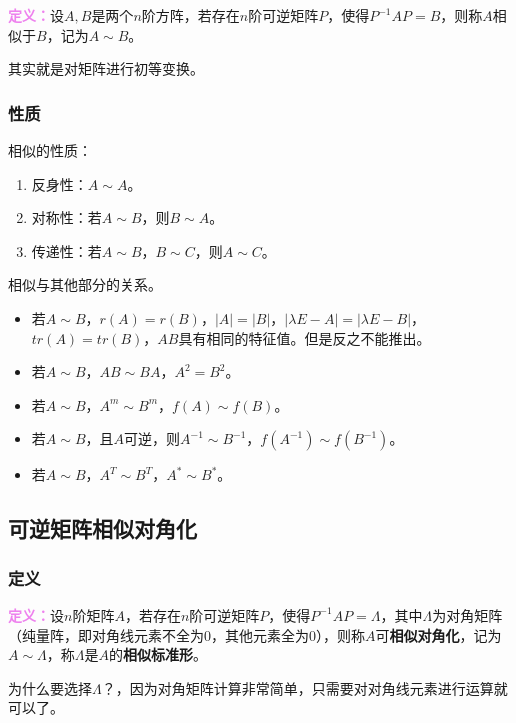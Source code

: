 \documentclass[UTF8, 12pt]{ctexart}
\begin{document}
\textcolor{violet}{\textbf{定义：}}设$A,B$是两个$n$阶方阵，若存在$n$阶可逆矩阵$P$，使得$P^{-1}AP=B$，则称$A$相似于$B$，记为$A\sim B$。

其实就是对矩阵进行初等变换。

\subsubsection{性质}

相似的性质：

\begin{enumerate}
    \item 反身性：$A\sim A$。
    \item 对称性：若$A\sim B$，则$B\sim A$。
    \item 传递性：若$A\sim B$，$B\sim C$，则$A\sim C$。
\end{enumerate}

相似与其他部分的关系。

\begin{itemize}
    \item 若$A\sim B$，$r(A)=r(B)$，$\vert A\vert=\vert B\vert$，$\vert\lambda E-A\vert=\vert\lambda E-B\vert$，$tr(A)=tr(B)$，$AB$具有相同的特征值。但是反之不能推出。
    \item 若$A\sim B$，$AB\sim BA$，$A^2=B^2$。
    \item 若$A\sim B$，$A^m\sim B^m$，$f(A)\sim f(B)$。
    \item 若$A\sim B$，且$A$可逆，则$A^{-1}\sim B^{-1}$，$f(A^{-1})\sim f(B^{-1})$。
    \item 若$A\sim B$，$A^T\sim B^T$，$A^*\sim B^*$。
\end{itemize}

\subsection{可逆矩阵相似对角化}

\subsubsection{定义}

\textcolor{violet}{\textbf{定义：}}设$n$阶矩阵$A$，若存在$n$阶可逆矩阵$P$，使得$P^{-1}AP=\Lambda$，其中$\Lambda$为对角矩阵（纯量阵，即对角线元素不全为0，其他元素全为0），则称$A$可\textbf{相似对角化}，记为$A\sim\Lambda$，称$\Lambda$是$A$的\textbf{相似标准形}。

为什么要选择$\Lambda$？，因为对角矩阵计算非常简单，只需要对对角线元素进行运算就可以了。
\end{document}
